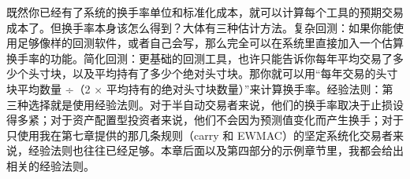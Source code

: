 \begin{chineseblock}既然你已经有了系统的换手率单位和标准化成本，就可以计算每个工具的预期交易成本了。但换手率本身该怎么得到？大体有三种估计方法。复杂回测：如果你能使用足够像样的回测软件，或者自己会写，那么完全可以在系统里直接加入一个估算换手率的功能。简化回测：更基础的回测工具，也许只能告诉你每年平均交易了多少个头寸块，以及平均持有了多少个绝对头寸块。那你就可以用“每年交易的头寸块平均数量 ÷（2 × 平均持有的绝对头寸块数量）”来计算换手率。经验法则：第三种选择就是使用经验法则。对于半自动交易者来说，他们的换手率取决于止损设得多紧；对于资产配置型投资者来说，他们不会因为预测值变化而产生换手；对于只使用我在第七章提供的那几条规则（carry 和 EWMAC）的坚定系统化交易者来说，经验法则也往往已经足够。本章后面以及第四部分的示例章节里，我都会给出相关的经验法则。\end{chineseblock}



